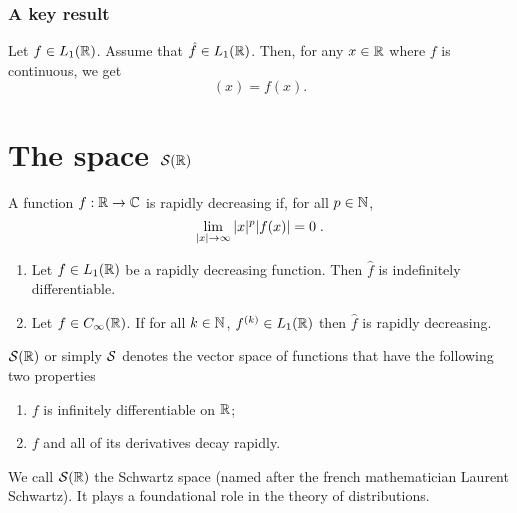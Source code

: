 \begin{frame}
\frametitle{A key result}
\begin{theorem}\label{prop:inversionFourierL1}
Let $f\in L_1(\mathbb{R})$. Assume that $\hat{f} \in L_1(\mathbb{R})$. Then, for any $x \in \mathbb{R}$ where $f$ is continuous, we get
\begin{equation*}
[\bar{\TF} \hat{f}](x) = f(x).
\end{equation*}
\end{theorem}
\end{frame}

\section{The space $\mathcal{S}(\mathbb{R})$}
\begin{frame}
\begin{definition}
A function  $f : \mathbb{R} \to \mathbb{C}$ is \alert{rapidly decreasing} if, for all $p \in \mathbb{N}$,
$$
\lim_{|x| \to \infty} |x|^p |f (x)| = 0 \;.
$$
\end{definition}
\begin{theorem}
\label{prop:1913}
\begin{enumerate}[label=(\roman*)]
\item Let  $f \in L_1(\mathbb{R})$ be a rapidly decreasing function. Then $\hat{f}$ is indefinitely differentiable.
\item Let $f \in C_\infty(\mathbb{R})$. If for all $k \in \mathbb{N}$, $f^{(k)} \in L_1(\mathbb{R})$ then $\hat{f}$ is rapidly decreasing.
\end{enumerate}
\end{theorem}
\end{frame}

\begin{frame}
\begin{definition} $\mathcal{S}(\mathbb{R})$ or simply $\mathcal{S}$ denotes the vector space of functions that have the following two properties
\begin{enumerate}[label=(\roman*)]
\item $f$ is infinitely differentiable on $\mathbb{R}$;
\item $f$ and all of its derivatives decay rapidly.
\end{enumerate}
\end{definition}
We call $\mathcal{S}(\mathbb{R})$ the \alert{Schwartz space} (named after the french mathematician Laurent Schwartz). It plays a foundational role in the theory of \alert{distributions}.
\end{frame}

